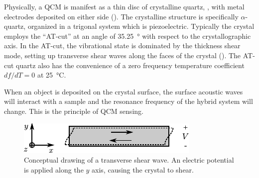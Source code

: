 Physically, a QCM is manifest as a thin disc of crystalline quartz,
, with metal electrodes deposited on either side
().  The crystalline structure is specifically
$\alpha$-quartz, organized in a trigonal system which is piezoelectric.
Typically the crystal employs the ``AT-cut'' at an angle of
\SI{35.25}{\degree} with respect to the crystallographic axis.  In the
AT-cut, the vibrational state is dominated by the thickness shear mode,
setting up transverse shear waves along the faces of the crystal
().  The AT-cut quartz also has the convenience of
a zero frequency temperature coefficient $df/dT=0$ at \SI{25}{\celsius}.

When an object is deposited on the crystal surface, the surface acoustic
waves will interact with a sample and the resonance frequency of the hybrid
system will change.  This is the principle of QCM sensing.
\begin{figure}[t]
 \centering
 	\includegraphics[keepaspectratio]{qcm/figures/qcm_shearmode.pdf}
	\caption{Conceptual drawing of a transverse shear wave.  An electric
	potential is applied along the $y$ axis, causing the crystal to
	shear.}
\label{fig:qcmshearwave}
\end{figure}
